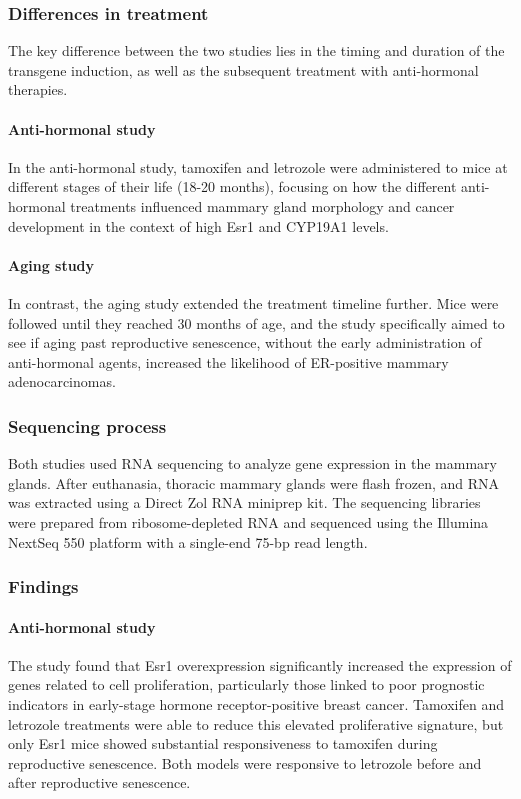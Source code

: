 \subsubsection{Differences in treatment}
The key difference between the two studies lies in the timing and duration of
the transgene induction, as well as the subsequent treatment with anti-hormonal
therapies.

\paragraph{Anti-hormonal study}
In the anti-hormonal study, tamoxifen and letrozole were administered to mice
at different stages of their life (18-20 months), focusing on how the different
anti-hormonal treatments influenced mammary gland morphology and cancer
development in the context of high Esr1 and CYP19A1
levels\supercite{furth_esr1_2023}.

\paragraph{Aging study}
In contrast, the aging study extended the treatment timeline further.
Mice were followed until they reached 30 months of age, and the study
specifically aimed to see if aging past reproductive senescence, without the
early administration of anti-hormonal agents, increased the likelihood of
ER-positive mammary adenocarcinomas\supercite{furth_overexpression_2023}.

\subsubsection{Sequencing process}
Both studies used RNA sequencing to analyze gene expression in the mammary
glands.
After euthanasia, thoracic mammary glands were flash frozen, and RNA was
extracted using a Direct Zol RNA miniprep kit.
The sequencing libraries were prepared from ribosome-depleted RNA and sequenced
using the Illumina NextSeq 550 platform with a single-end 75-bp read
length\supercite{furth_esr1_2023,furth_overexpression_2023}.

\subsubsection{Findings}

\paragraph{Anti-hormonal study}
The study found that Esr1 overexpression significantly increased the expression
of genes related to cell proliferation, particularly those linked to poor
prognostic indicators in early-stage hormone receptor-positive breast cancer.
Tamoxifen and letrozole treatments were able to reduce this elevated
proliferative signature, but only Esr1 mice showed substantial responsiveness
to tamoxifen during reproductive senescence.
Both models were responsive to letrozole before and after reproductive
senescence\supercite{furth_esr1_2023}.

